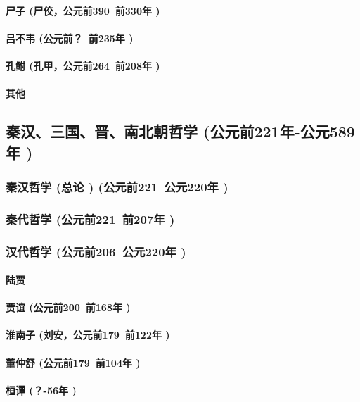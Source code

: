 \documentclass[UTF8]{../RepresentationUniverse}
\begin{document}
        \paragraph{尸子 (尸佼，公元前390~前330年 )}
        \paragraph{吕不韦 (公元前？~前235年 )}
        \paragraph{孔鲋 (孔甲，公元前264~前208年 )}
        \paragraph{其他}


\subsection{秦汉、三国、晋、南北朝哲学 (公元前221年-公元589年 )}
    \subsubsection{秦汉哲学 (总论 ) (公元前221~公元220年 )}
    \subsubsection{秦代哲学 (公元前221~前207年 )}
    \subsubsection{汉代哲学 (公元前206~公元220年 )}

        \paragraph{陆贾}
        \paragraph{贾谊 (公元前200~前168年 )}
        \paragraph{淮南子 (刘安，公元前179~前122年 )}
        \paragraph{董仲舒 (公元前179~前104年 )}
        \paragraph{桓谭 (？-56年 )}
\end{document}
